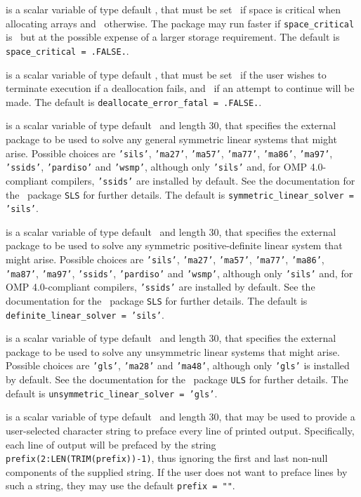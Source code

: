 \documentclass{galahad}
\begin{document}
\begin{description}
 is a scalar variable of type default \logical,
that must be set \true\ if space is critical when allocating arrays
and  \false\ otherwise. The package may run faster if
{\tt space\_critical} is \false\ but at the possible expense of a larger
storage requirement. The default is {\tt space\_critical = .FALSE.}.

 is a scalar variable of type default \logical,
that must be set \true\ if the user wishes to terminate execution if
a deallocation  fails, and \false\ if an attempt to continue
will be made. The default is {\tt deallocate\_error\_fatal = .FALSE.}.

 is a scalar variable of type default \character\
and length 30, that specifies the external package to be used to
solve any general symmetric linear systems that might arise. Possible
choices are
{\tt 'sils'},
{\tt 'ma27'},
{\tt 'ma57'},
{\tt 'ma77'},
{\tt 'ma86'},
{\tt 'ma97'},
{\tt 'ssids'},
{\tt 'pardiso'}
and
{\tt 'wsmp'},
although only {\tt 'sils'} and, for OMP 4.0-compliant compilers,
{\tt 'ssids'} are installed by default.
See the documentation for the \galahad\ package {\tt SLS} for further details.
The default is {\tt symmetric\_linear\_solver = 'sils'}.

 is a scalar variable of type default \character\
and length 30, that specifies the external package to be used to
solve any symmetric positive-definite linear system that might arise. Possible
choices are
{\tt 'sils'},
{\tt 'ma27'},
{\tt 'ma57'},
{\tt 'ma77'},
{\tt 'ma86'},
{\tt 'ma87'},
{\tt 'ma97'},
{\tt 'ssids'},
{\tt 'pardiso'}
and
{\tt 'wsmp'},
although only {\tt 'sils'} and, for OMP 4.0-compliant compilers,
{\tt 'ssids'} are installed by default.
See the documentation for the \galahad\ package {\tt SLS} for further details.
The default is {\tt definite\_linear\_solver = 'sils'}.

 is a scalar variable of type default
\character\
and length 30, that specifies the external package to be used to
solve any unsymmetric linear systems that might arise. Possible
choices are
{\tt 'gls'},
{\tt 'ma28'}
and
{\tt 'ma48'},
although only {\tt 'gls'} is installed by default.
See the documentation for the \galahad\ package {\tt ULS} for further details.
The default is {\tt unsymmetric\_linear\_solver = 'gls'}.

\itt{prefix} is a scalar variable of type default \character\
and length 30, that may be used to provide a user-selected
character string to preface every line of printed output.
Specifically, each line of output will be prefaced by the string
{\tt prefix(2:LEN(TRIM(prefix))-1)},
thus ignoring the first and last non-null components of the
supplied string. If the user does not want to preface lines by such
a string, they may use the default {\tt prefix = ""}.


\end{description}
\end{document}
